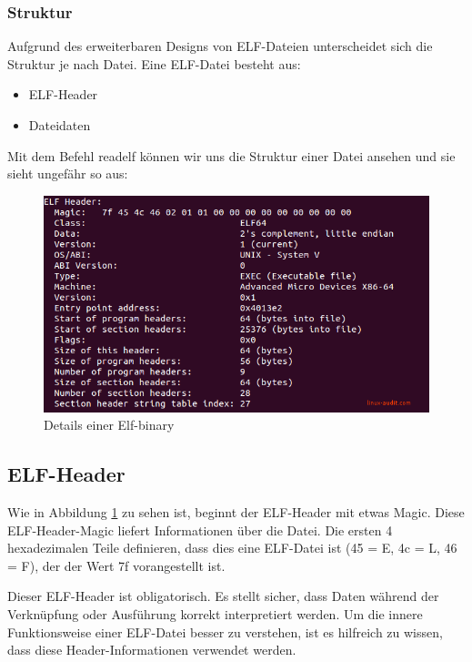\subsubsection{Struktur}
Aufgrund des erweiterbaren Designs von ELF-Dateien unterscheidet sich die Struktur je nach Datei. Eine ELF-Datei besteht aus:

\begin{itemize} 
\item ELF-Header
\item Dateidaten
\end{itemize}

Mit dem Befehl readelf können wir uns die Struktur einer Datei ansehen und sie sieht ungefähr so aus:

\begin{figure}[H]
    \begin{center}
        \includegraphics[scale=0.5]{images/elf-header-linux-binary.png}
        \caption{Details einer Elf-binary \cite{details_of_Elf_binary}}
        \label{abb:details-elf}
    \end{center}
\end{figure}

\subsection{ELF-Header}
Wie in Abbildung \ref{abb:details-elf} zu sehen ist, beginnt der ELF-Header mit etwas Magic. Diese ELF-Header-Magic liefert Informationen über die Datei. Die ersten 4 hexadezimalen Teile definieren, dass dies eine ELF-Datei ist (45 = E, 4c = L, 46 = F), der der Wert 7f vorangestellt ist.
 
Dieser ELF-Header ist obligatorisch. Es stellt sicher, dass Daten während der Verknüpfung oder Ausführung korrekt interpretiert werden. Um die innere Funktionsweise einer ELF-Datei besser zu verstehen, ist es hilfreich zu wissen, dass diese Header-Informationen verwendet werden.
 
